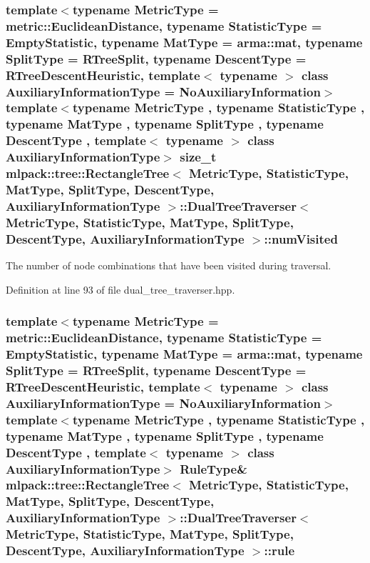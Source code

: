 \subsubsection[{num\+Visited}]{\setlength{\rightskip}{0pt plus 5cm}template$<$typename Metric\+Type  = metric\+::\+Euclidean\+Distance, typename Statistic\+Type  = Empty\+Statistic, typename Mat\+Type  = arma\+::mat, typename Split\+Type  = R\+Tree\+Split, typename Descent\+Type  = R\+Tree\+Descent\+Heuristic, template$<$ typename $>$ class Auxiliary\+Information\+Type = No\+Auxiliary\+Information$>$ template$<$typename Metric\+Type , typename Statistic\+Type , typename Mat\+Type , typename Split\+Type , typename Descent\+Type , template$<$ typename $>$ class Auxiliary\+Information\+Type$>$ size\+\_\+t {\bf mlpack\+::tree\+::\+Rectangle\+Tree}$<$ Metric\+Type, Statistic\+Type, Mat\+Type, {\bf Split\+Type}, {\bf Descent\+Type}, Auxiliary\+Information\+Type $>$\+::{\bf Dual\+Tree\+Traverser}$<$ Metric\+Type, Statistic\+Type, Mat\+Type, {\bf Split\+Type}, {\bf Descent\+Type}, Auxiliary\+Information\+Type $>$\+::num\+Visited\hspace{0.3cm}{\ttfamily [private]}}\label{classmlpack_1_1tree_1_1RectangleTree_1_1DualTreeTraverser_aa5c4f93304a6e8181dcb922abb39a4aa}


The number of node combinations that have been visited during traversal. 



Definition at line 93 of file dual\+\_\+tree\+\_\+traverser.\+hpp.

\subsubsection[{rule}]{\setlength{\rightskip}{0pt plus 5cm}template$<$typename Metric\+Type  = metric\+::\+Euclidean\+Distance, typename Statistic\+Type  = Empty\+Statistic, typename Mat\+Type  = arma\+::mat, typename Split\+Type  = R\+Tree\+Split, typename Descent\+Type  = R\+Tree\+Descent\+Heuristic, template$<$ typename $>$ class Auxiliary\+Information\+Type = No\+Auxiliary\+Information$>$ template$<$typename Metric\+Type , typename Statistic\+Type , typename Mat\+Type , typename Split\+Type , typename Descent\+Type , template$<$ typename $>$ class Auxiliary\+Information\+Type$>$ Rule\+Type\& {\bf mlpack\+::tree\+::\+Rectangle\+Tree}$<$ Metric\+Type, Statistic\+Type, Mat\+Type, {\bf Split\+Type}, {\bf Descent\+Type}, Auxiliary\+Information\+Type $>$\+::{\bf Dual\+Tree\+Traverser}$<$ Metric\+Type, Statistic\+Type, Mat\+Type, {\bf Split\+Type}, {\bf Descent\+Type}, Auxiliary\+Information\+Type $>$\+::rule\hspace{0.3cm}{\ttfamily [private]}}\label{classmlpack_1_1tree_1_1RectangleTree_1_1DualTreeTraverser_ab2092fd36ff02e28c4efc2d235f1b61d}


